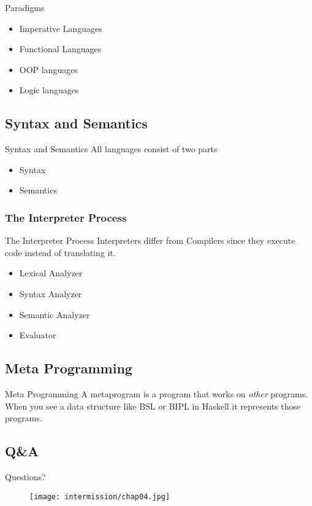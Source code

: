 \begin{frame}{Paradigms}
    \begin{itemize}[<+->]
        \item Imperative Languages
        \item Functional Languages
        \item OOP languages
        \item Logic languages
    \end{itemize}
\end{frame}

\subsection*{Syntax and Semantics}
\begin{frame}{Syntax and Semantics}
    All languages consist of two parts
    \begin{itemize}[<+->]
        \item Syntax
        \item Semantics
    \end{itemize}
\end{frame}

\subsubsection{The Interpreter Process}
\begin{frame}{The Interpreter Process}
    Interpreters differ from Compilers since they execute code instead of translating it.
    \begin{itemize}[<+->]
        \item Lexical Analyzer
        \item Syntax Analyzer
        \item Semantic Analyzer
        \item Evaluator
    \end{itemize}
\end{frame}

\subsection{Meta Programming}
\begin{frame}{Meta Programming}
    A metaprogram is a program that works on \textit{other} programs.\\
    When you see a data structure like BSL or BIPL in Haskell it represents those programs.
\end{frame}

\subsection*{Q\&A}
\begin{frame}{Questions?}
    \begin{figure}
        \centering
        \texttt{[image: intermission/chap04.jpg]}
    \end{figure}
\end{frame}